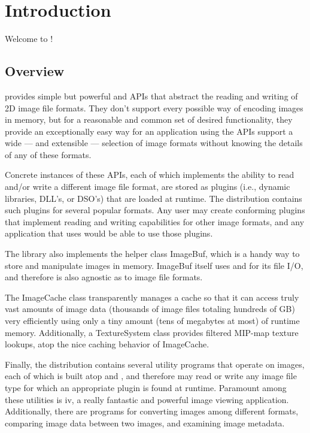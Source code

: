 \chapter{Introduction}
\label{chap:oiiointro}



Welcome to \product!

\bigskip

\section{Overview}

\product provides simple but powerful \ImageInput and \ImageOutput APIs
that abstract the reading and writing of 2D image file formats.  They
don't support every possible way of encoding images in memory, but for a
reasonable and common set of desired functionality, they provide an
exceptionally easy way for an application using the APIs support a wide
--- and extensible --- selection of image formats without knowing the
details of any of these formats.

Concrete instances of these APIs, each of which implements the ability
to read and/or write a different image file format, are stored as
plugins (i.e., dynamic libraries, DLL's, or DSO's) that are loaded at
runtime.  The \product distribution contains such plugins for several
popular formats.  Any user may create conforming plugins that implement
reading and writing capabilities for other image formats, and any
application that uses \product would be able to use those plugins.

The library also implements the helper class {\kw ImageBuf}, which is a
handy way to store and manipulate images in memory.  {\kw ImageBuf}
itself uses \ImageInput and \ImageOutput for its file I/O, and therefore
is also agnostic as to image file formats.

The {\kw ImageCache} class transparently manages a cache so that it can
access truly vast amounts of image data (thousands of image files
totaling hundreds of GB) very efficiently using only a tiny amount (tens of
megabytes at most) of runtime memory.  Additionally, a {\kw
  TextureSystem} class provides filtered MIP-map texture lookups, atop
the nice caching behavior of {\kw ImageCache}.

Finally, the \product distribution contains several utility programs
that operate on images, each of which is built atop \ImageInput and
\ImageOutput, and therefore may read or write any image file type for
which an appropriate plugin is found at runtime.  Paramount among these
utilities is {\fn iv}, a really fantastic and powerful image viewing
application.  Additionally, there are programs for converting images
among different formats, comparing image data between two images, 
and examining image metadata.

